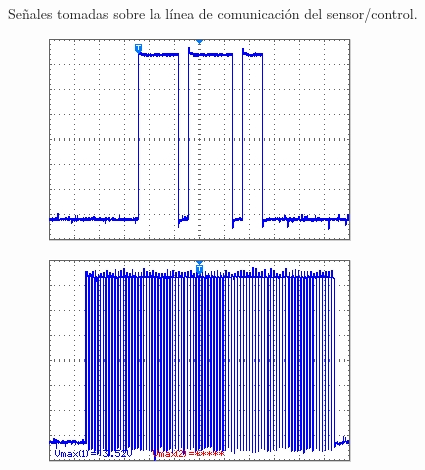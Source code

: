 \documentclass[11pt,a4paper,oneside]{article}
\begin{document}
\begin{figure}[H]
\begin{subfigure}[b]{0.33\textwidth}
    \label{fig:line-per-3}
  \end{subfigure}
  \caption{Señales tomadas sobre la línea de comunicación del sensor/control.}
  \label{fig:senales-linea}
\end{figure}

\begin{figure}[H]
  \begin{subfigure}[b]{0.33\textwidth}
    \centering
    \includegraphics[width=\textwidth]{images/out_periodo_1}
    \label{fig:out-per-1}
  \end{subfigure}
  \begin{subfigure}[b]{0.33\textwidth}
    \centering
    \includegraphics[width=\textwidth]{images/out_periodo_2}
    \label{fig:out-per-2}
  \end{subfigure}
  \begin{subfigure}[b]{0.33\textwidth}

\end{subfigure}
\end{figure}
\end{document}
